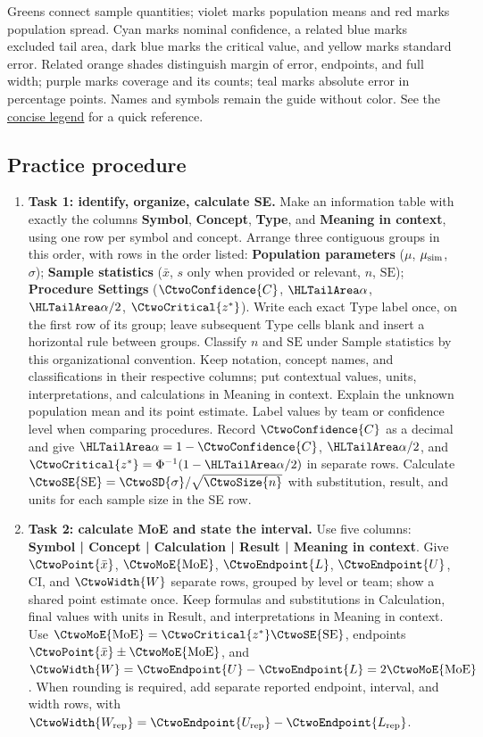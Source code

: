 Greens connect sample quantities; violet marks population means and red marks population spread. Cyan marks nominal confidence, a related blue marks excluded tail area, dark blue marks the critical value, and yellow marks standard error. Related orange shades distinguish margin of error, endpoints, and full width; purple marks coverage and its counts; teal marks absolute error in percentage points. Names and symbols remain the guide without color. See the \hyperref[tab:highlight-legend]{concise legend} for a quick reference.

\subsection{Practice procedure}

\begin{enumerate}
    \item \textbf{Task 1: identify, organize, calculate SE.} Make an information table with exactly the columns \textbf{Symbol}, \textbf{Concept}, \textbf{Type}, and \textbf{Meaning in context}, using one row per symbol and concept. Arrange three contiguous groups in this order, with rows in the order listed: \textbf{Population parameters} ($\mu$, $\mu_{\rm sim}$, $\sigma$); \textbf{Sample statistics} ($\bar{x}$, $s$ only when provided or relevant, $n$, $\mathrm{SE}$); \textbf{Procedure Settings} ($\CtwoConfidence{C}$, $\CtwoSignificance{\alpha}$, $\CtwoSignificance{\alpha/2}$, $\CtwoCritical{z^*}$). Write each exact Type label once, on the first row of its group; leave subsequent Type cells blank and insert a horizontal rule between groups. Classify $n$ and $\mathrm{SE}$ under Sample statistics by this organizational convention. Keep notation, concept names, and classifications in their respective columns; put contextual values, units, interpretations, and calculations in Meaning in context. Explain the unknown population mean and its point estimate. Label values by team or confidence level when comparing procedures. Record $\CtwoConfidence{C}$ as a decimal and give $\CtwoSignificance{\alpha}=1-\CtwoConfidence{C}$, $\CtwoSignificance{\alpha/2}$, and $\CtwoCritical{z^*}=\Phi^{-1}(1-\CtwoSignificance{\alpha/2})$ in separate rows. Calculate $\CtwoSE{\mathrm{SE}}=\CtwoSD{\sigma}/\sqrt{\CtwoSize{n}}$ with substitution, result, and units for each sample size in the SE row.
    \item \textbf{Task 2: calculate MoE and state the interval.} Use five columns: \textbf{Symbol | Concept | Calculation | Result | Meaning in context}. Give $\CtwoPoint{\bar{x}}$, $\CtwoMoE{\mathrm{MoE}}$, $\CtwoEndpoint{L}$, $\CtwoEndpoint{U}$, $\mathrm{CI}$, and $\CtwoWidth{W}$ separate rows, grouped by level or team; show a shared point estimate once. Keep formulas and substitutions in Calculation, final values with units in Result, and interpretations in Meaning in context. Use $\CtwoMoE{\mathrm{MoE}}=\CtwoCritical{z^*}\CtwoSE{\mathrm{SE}}$, endpoints $\CtwoPoint{\bar{x}}\pm\CtwoMoE{\mathrm{MoE}}$, and $\CtwoWidth{W}=\CtwoEndpoint{U}-\CtwoEndpoint{L}=2\CtwoMoE{\mathrm{MoE}}$. When rounding is required, add separate reported endpoint, interval, and width rows, with $\CtwoWidth{W_{\rm rep}}=\CtwoEndpoint{U_{\rm rep}}-\CtwoEndpoint{L_{\rm rep}}$.

\end{enumerate}

